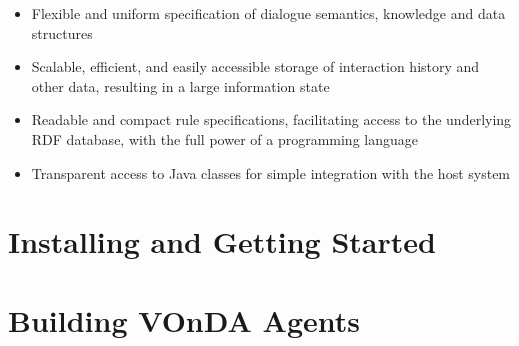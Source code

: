 \documentclass[a4paper]{report}
\begin{document}
\begin{itemize}
  \addtolength{\itemsep}{-.6\itemsep}
\item Flexible and uniform specification of dialogue semantics, knowledge and
  data structures
\item Scalable, efficient, and easily accessible storage of interaction history
  and other data, resulting in a large information state
\item Readable and compact rule specifications, facilitating access to the
  underlying RDF database, with the full power of a programming language
\item Transparent access to Java classes for simple integration with the host
  system
\end{itemize}
\fi



%

\chapter{Installing and Getting Started}


\newpage

\newpage


\chapter{Building VOnDA Agents}

\newpage

\newpage



\end{document}
